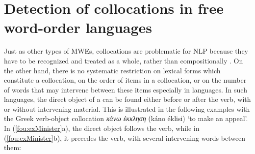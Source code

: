 \documentclass[output=paper]{langsci/langscibook}
\begin{document}
\section{Detection of collocations in free word-order languages}
\label{fou:sec4}
Just as other types of MWEs, collocations are problematic for NLP because they have to be recognized and treated as a whole, rather than compositionally \citep{sag02}. On the other hand, there is no systematic restriction on lexical forms which constitute a collocation, on the order of items in a collocation, or on the number of words that may intervene between these items especially in  languages. In such languages, the direct object of a  can be found either before or after the verb, with or without intervening material. This is illustrated in the following examples with the Greek verb-object collocation {\em κάνω έκκληση} (káno éklisi)
`to make an appeal'. 
In (\ref{fou:exMinister}a), %
the direct object 
follows the verb, while in (\ref{fou:exMinister}b), %
it precedes the verb, with several intervening words between them:


\end{document}
